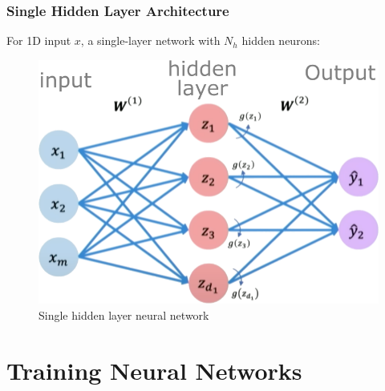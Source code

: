 \documentclass[notes]{beamer}
\begin{document}
\begin{frame}
\frametitle{Single Hidden Layer Architecture}

For 1D input $x$, a single-layer network with $N_h$ hidden neurons:
 \begin{minipage}[t]{0.48\textwidth}
\end{minipage}
\hfill
\begin{minipage}[t]{0.48\textwidth}
\begin{figure}[ht]
	\centering
	\includegraphics[width=0.9\linewidth]{figs/single-layer-nn2.png}
	\caption*{Single hidden layer neural network}
\end{figure}
\end{minipage}

\end{frame}

\section{Training Neural Networks}
\end{document}
